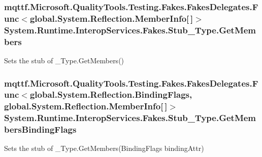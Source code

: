 \hypertarget{class_system_1_1_runtime_1_1_interop_services_1_1_fakes_1_1_stub___type_aec83730105387ca48544d395bf479fdc}{
\subsubsection[{Get\-Members}]{\setlength{\rightskip}{0pt plus 5cm}mqttf.\-Microsoft.\-Quality\-Tools.\-Testing.\-Fakes.\-Fakes\-Delegates.\-Func$<$global.\-System.\-Reflection.\-Member\-Info\mbox{[}$\,$\mbox{]}$>$ System.\-Runtime.\-Interop\-Services.\-Fakes.\-Stub\-\_\-\-Type.\-Get\-Members}}\label{class_system_1_1_runtime_1_1_interop_services_1_1_fakes_1_1_stub___type_aec83730105387ca48544d395bf479fdc}


Sets the stub of \-\_\-\-Type.\-Get\-Members()

\hypertarget{class_system_1_1_runtime_1_1_interop_services_1_1_fakes_1_1_stub___type_ac880d079f6562c22c1b1bc26749bafcd}{
\subsubsection[{Get\-Members\-Binding\-Flags}]{\setlength{\rightskip}{0pt plus 5cm}mqttf.\-Microsoft.\-Quality\-Tools.\-Testing.\-Fakes.\-Fakes\-Delegates.\-Func$<$global.\-System.\-Reflection.\-Binding\-Flags, global.\-System.\-Reflection.\-Member\-Info\mbox{[}$\,$\mbox{]}$>$ System.\-Runtime.\-Interop\-Services.\-Fakes.\-Stub\-\_\-\-Type.\-Get\-Members\-Binding\-Flags}}\label{class_system_1_1_runtime_1_1_interop_services_1_1_fakes_1_1_stub___type_ac880d079f6562c22c1b1bc26749bafcd}


Sets the stub of \-\_\-\-Type.\-Get\-Members(\-Binding\-Flags binding\-Attr)

